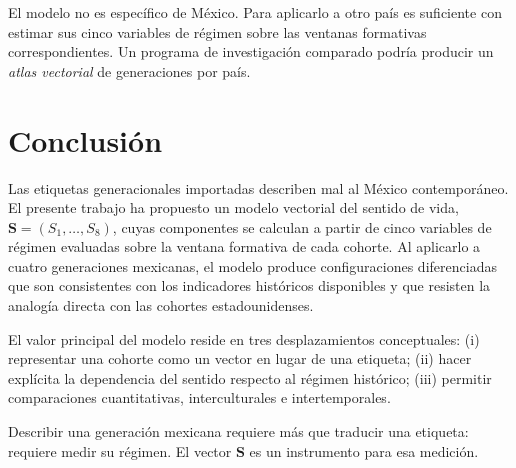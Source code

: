 \documentclass[conference,spanish]{IEEEtran}
\begin{document}
El modelo no es específico de México. Para aplicarlo a otro país es suficiente con estimar sus cinco variables de régimen sobre las ventanas formativas correspondientes. Un programa de investigación comparado podría producir un \textit{atlas vectorial} de generaciones por país.

\section{Conclusión}
\label{sec:conclusion}

Las etiquetas generacionales importadas describen mal al México contemporáneo. El presente trabajo ha propuesto un modelo vectorial del sentido de vida, $\mathbf{S} = (S_1, \ldots, S_8)$, cuyas componentes se calculan a partir de cinco variables de régimen evaluadas sobre la ventana formativa de cada cohorte. Al aplicarlo a cuatro generaciones mexicanas, el modelo produce configuraciones diferenciadas que son consistentes con los indicadores históricos disponibles \cite{inegi2024homicidios, worldbank2024, latinobarometro2023, inegi2024endutih} y que resisten la analogía directa con las cohortes estadounidenses.

El valor principal del modelo reside en tres desplazamientos conceptuales: (i) representar una cohorte como un vector en lugar de una etiqueta; (ii) hacer explícita la dependencia del sentido respecto al régimen histórico; (iii) permitir comparaciones cuantitativas, interculturales e intertemporales.

Describir una generación mexicana requiere más que traducir una etiqueta: requiere medir su régimen. El vector $\mathbf{S}$ es un instrumento para esa medición.
\end{document}
